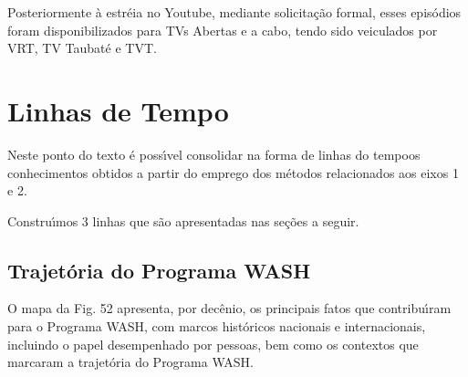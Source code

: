 \documentclass[
12pt,		%
openright,	%
twoside,  %
a4paper,			%
chapter=TITLE,		%
english,			%
french,				%
spanish,			%
brazil				%
]{USPSC-classe/USPSC}
\begin{document}
Posteriormente \`a estr\'eia no Youtube, mediante solicita\c{c}\~ao formal, esses epis\'odios foram disponibilizados para TVs Abertas e \textquotedbl a cabo\textquotedbl , tendo sido veiculados por VRT, TV Taubat\'e e TVT.

















\section[Linhas de Tempo]{Linhas de Tempo}\label{Linhas de Tempo}
Neste ponto do texto \'e poss\'{\i}vel consolidar na forma de \textquotedbl linhas do tempo\textquotedbl  os conhecimentos obtidos a partir do emprego dos m\'etodos relacionados aos eixos 1 e 2.

















Constru\'{\i}mos 3 linhas que s\~ao apresentadas nas se\c{c}\~oes a seguir.

















\subsection[Trajet\'oria do Programa WASH]{Trajet\'oria do Programa WASH}\label{Trajet\'oria do Programa WASH}
O mapa da Fig. 52 apresenta, por dec\^enio, os principais fatos que contribu\'{\i}ram para o Programa WASH, com marcos hist\'oricos nacionais e internacionais, incluindo o papel desempenhado por pessoas, bem como os contextos que marcaram a trajet\'oria do Programa WASH.
\end{document}
